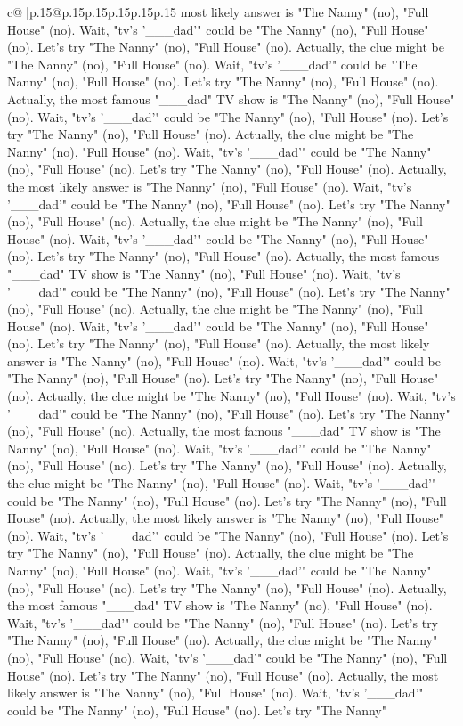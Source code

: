\documentclass{article}
\begin{document}
{\begin{supertabular}{c@{$\;$}|p{.15\linewidth}@{}p{.15\linewidth}p{.15\linewidth}p{.15\linewidth}p{.15\linewidth}p{.15\linewidth}}
{{{most likely answer is "The Nanny" (no), "Full House" (no). Wait, "tv's '\_\_\_dad'" could be "The Nanny" (no), "Full House" (no). Let's try "The Nanny" (no), "Full House" (no). Actually, the clue might be "The Nanny" (no), "Full House" (no). Wait, "tv's '\_\_\_dad'" could be "The Nanny" (no), "Full House" (no). Let's try "The Nanny" (no), "Full House" (no). Actually, the most famous "\_\_\_dad" TV show is "The Nanny" (no), "Full House" (no). Wait, "tv's '\_\_\_dad'" could be "The Nanny" (no), "Full House" (no). Let's try "The Nanny" (no), "Full House" (no). Actually, the clue might be "The Nanny" (no), "Full House" (no). Wait, "tv's '\_\_\_dad'" could be "The Nanny" (no), "Full House" (no). Let's try "The Nanny" (no), "Full House" (no). Actually, the most likely answer is "The Nanny" (no), "Full House" (no). Wait, "tv's '\_\_\_dad'" could be "The Nanny" (no), "Full House" (no). Let's try "The Nanny" (no), "Full House" (no). Actually, the clue might be "The Nanny" (no), "Full House" (no). Wait, "tv's '\_\_\_dad'" could be "The Nanny" (no), "Full House" (no). Let's try "The Nanny" (no), "Full House" (no). Actually, the most famous "\_\_\_dad" TV show is "The Nanny" (no), "Full House" (no). Wait, "tv's '\_\_\_dad'" could be "The Nanny" (no), "Full House" (no). Let's try "The Nanny" (no), "Full House" (no). Actually, the clue might be "The Nanny" (no), "Full House" (no). Wait, "tv's '\_\_\_dad'" could be "The Nanny" (no), "Full House" (no). Let's try "The Nanny" (no), "Full House" (no). Actually, the most likely answer is "The Nanny" (no), "Full House" (no). Wait, "tv's '\_\_\_dad'" could be "The Nanny" (no), "Full House" (no). Let's try "The Nanny" (no), "Full House" (no). Actually, the clue might be "The Nanny" (no), "Full House" (no). Wait, "tv's '\_\_\_dad'" could be "The Nanny" (no), "Full House" (no). Let's try "The Nanny" (no), "Full House" (no). Actually, the most famous "\_\_\_dad" TV show is "The Nanny" (no), "Full House" (no). Wait, "tv's '\_\_\_dad'" could be "The Nanny" (no), "Full House" (no). Let's try "The Nanny" (no), "Full House" (no). Actually, the clue might be "The Nanny" (no), "Full House" (no). Wait, "tv's '\_\_\_dad'" could be "The Nanny" (no), "Full House" (no). Let's try "The Nanny" (no), "Full House" (no). Actually, the most likely answer is "The Nanny" (no), "Full House" (no). Wait, "tv's '\_\_\_dad'" could be "The Nanny" (no), "Full House" (no). Let's try "The Nanny" (no), "Full House" (no). Actually, the clue might be "The Nanny" (no), "Full House" (no). Wait, "tv's '\_\_\_dad'" could be "The Nanny" (no), "Full House" (no). Let's try "The Nanny" (no), "Full House" (no). Actually, the most famous "\_\_\_dad" TV show is "The Nanny" (no), "Full House" (no). Wait, "tv's '\_\_\_dad'" could be "The Nanny" (no), "Full House" (no). Let's try "The Nanny" (no), "Full House" (no). Actually, the clue might be "The Nanny" (no), "Full House" (no). Wait, "tv's '\_\_\_dad'" could be "The Nanny" (no), "Full House" (no). Let's try "The Nanny" (no), "Full House" (no). Actually, the most likely answer is "The Nanny" (no), "Full House" (no). Wait, "tv's '\_\_\_dad'" could be "The Nanny" (no), "Full House" (no). Let's try "The Nanny" }}}
\end{supertabular}}
\end{document}
